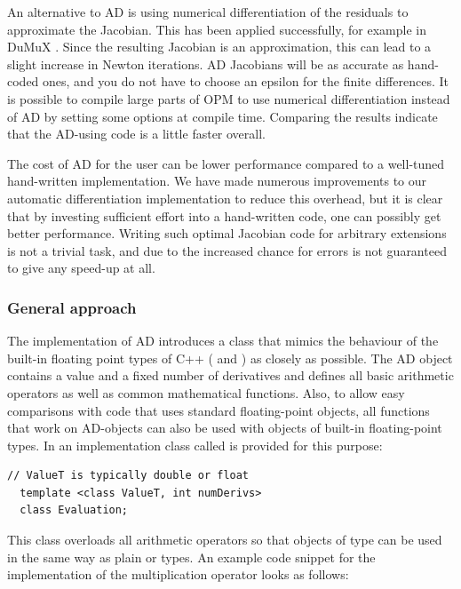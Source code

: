 {\revised An alternative to AD is using numerical differentiation of the
residuals to approximate the Jacobian. This has been applied
successfully, for example in DuMuX \citep{DuMuX}. Since the resulting
Jacobian is an approximation, this can lead to a slight increase in
Newton iterations. AD Jacobians will be as accurate as hand-coded ones,
and you do not have to choose an epsilon for the finite differences.
It is possible to compile large parts of OPM to use
numerical differentiation instead of AD by setting some options at
compile time. Comparing the results indicate that the AD-using code is
a little faster overall.}

The cost of AD for the user can be lower performance compared
to a well-tuned hand-written implementation. We have made numerous
improvements to our automatic differentiation implementation
to reduce this overhead, but it is clear that by investing
sufficient effort into a hand-written code, one can possibly get
better performance. Writing such optimal Jacobian code for arbitrary
extensions is not a trivial task, and due to the increased chance for
errors is not guaranteed to give any speed-up at all.

\subsubsection{General approach}

The \opm implementation of AD introduces a class that mimics the behaviour of the built-in
floating point types of C++ ( and ) as closely as possible. The
AD object contains a value and a fixed number of derivatives and defines all basic
arithmetic operators as well as common mathematical functions. Also, to allow easy
comparisons with code that uses standard floating-point objects, all functions that work
on AD-objects can also be used with objects of built-in floating-point types. In \opm an
implementation class called  is provided for this purpose:

\begin{lstlisting}[style=cppstyle]
  // ValueT is typically double or float
  template <class ValueT, int numDerivs>
  class Evaluation;
\end{lstlisting}

This class overloads all arithmetic operators so that objects of type 
can be used in the same way as plain  or  types. An example code
snippet for the implementation of the multiplication operator looks as follows: 

